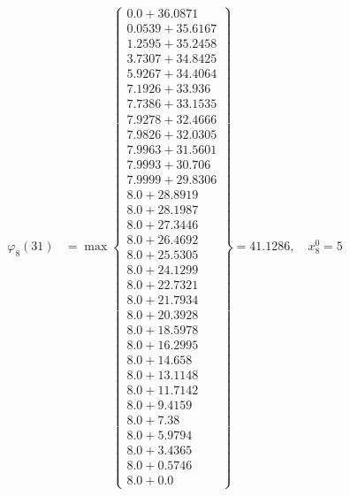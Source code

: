 \documentclass{article}
\begin{document}
\begin{align*}
\varphi_{8}(31) &= \max \left\{ \begin{array}{c}
0.0 + 36.0871 \\
 0.0539 + 35.6167 \\
 1.2595 + 35.2458 \\
 3.7307 + 34.8425 \\
 5.9267 + 34.4064 \\
 7.1926 + 33.936 \\
 7.7386 + 33.1535 \\
 7.9278 + 32.4666 \\
 7.9826 + 32.0305 \\
 7.9963 + 31.5601 \\
 7.9993 + 30.706 \\
 7.9999 + 29.8306 \\
 8.0 + 28.8919 \\
 8.0 + 28.1987 \\
 8.0 + 27.3446 \\
 8.0 + 26.4692 \\
 8.0 + 25.5305 \\
 8.0 + 24.1299 \\
 8.0 + 22.7321 \\
 8.0 + 21.7934 \\
 8.0 + 20.3928 \\
 8.0 + 18.5978 \\
 8.0 + 16.2995 \\
 8.0 + 14.658 \\
 8.0 + 13.1148 \\
 8.0 + 11.7142 \\
 8.0 + 9.4159 \\
 8.0 + 7.38 \\
 8.0 + 5.9794 \\
 8.0 + 3.4365 \\
 8.0 + 0.5746 \\
 8.0 + 0.0
\end{array} \right\}=41.1286, \quad x_{8}^0=5\\
  

\end{align*}
\end{document}
